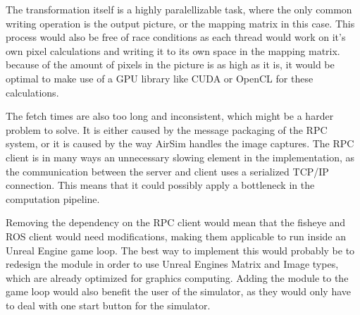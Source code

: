 The transformation itself is a highly paralellizable task, where the only common writing operation is the output picture, or the mapping matrix in this case. This process would also be free of race conditions as each thread would work on it's own pixel calculations and writing it to its own space in the mapping matrix. because of the amount of pixels in the picture is as high as it is, it would be optimal to make use of a GPU library like CUDA or OpenCL for these calculations.

The fetch times are also too long and inconsistent, which might be a harder problem to solve. It is either caused by the message packaging of the RPC system, or it is caused by the way AirSim handles the image captures. The RPC client is in many ways an unnecessary slowing element in the implementation, as the communication between the server and client uses a serialized TCP/IP connection. This means that it could possibly apply a bottleneck in the computation pipeline.

Removing the dependency on the RPC client would mean that the fisheye and ROS client would need modifications, making them applicable to run inside an Unreal Engine game loop. The best way to implement this would probably be to redesign the module in order to use Unreal Engines Matrix and Image types, which are already optimized for graphics computing. Adding the module to the game loop would also benefit the user of the simulator, as they would only have to deal with one start button for the simulator. 


\cleardoublepage